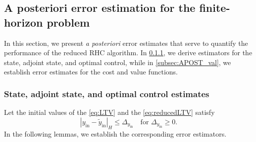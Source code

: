 \documentclass{m2an}
\newcommand{\yint}{y_{\mathrm{in}}}
\newcommand{\tildeyint}{\tilde y_{\mathrm{in}}}
\newcommand{\norm}[2]{\left|#1\right|_{#2}}
\begin{document}
\subsection{A posteriori error estimation for the finite-horizon problem}\label{subsec:apost}
%
In this section, we present \emph{a posteriori} error estimates that serve to quantify the performance of the reduced RHC algorithm. In \cref{subsec:APOS_stat}, we derive estimators for the state, adjoint state, and optimal control, while in \cref{subsec:APOST_val}, we establish error estimates for the cost and value functions.
%
\subsubsection{State, adjoint state, and optimal control estimates}\label{subsec:APOS_stat}
%
Let the initial values of the \eqref{eq:LTV} and the \eqref{eq:reducedLTV} satisfy 
%
\begin{equation}\label{eq:perturb_init}
    \norm{ \yint-\tildeyint}{H} \leq \Delta_{\yint} \quad \text{for } \Delta_{\yint}\geq 0.
\end{equation}
%
In the following lemmas, we establish the corresponding error estimators.
%
\end{document}

